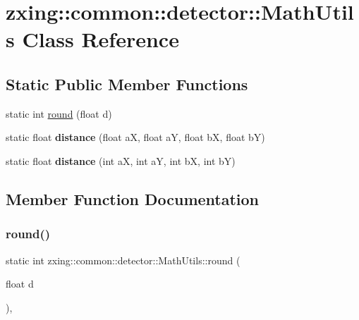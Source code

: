 \hypertarget{classzxing_1_1common_1_1detector_1_1_math_utils}{}\section{zxing\+:\+:common\+:\+:detector\+:\+:Math\+Utils Class Reference}
\label{classzxing_1_1common_1_1detector_1_1_math_utils}
\subsection*{Static Public Member Functions}
\begin{DoxyCompactItemize}
\item 
static int \mbox{\hyperlink{classzxing_1_1common_1_1detector_1_1_math_utils_a078e225901bb37f131130b53b9304bc3}{round}} (float d)
\item 
\mbox{\label{classzxing_1_1common_1_1detector_1_1_math_utils_a7c1f016269985e60e23987c7d73a069c}} 
static float {\bfseries distance} (float aX, float aY, float bX, float bY)
\item 
\mbox{\label{classzxing_1_1common_1_1detector_1_1_math_utils_a26b3d98128ac1b65952a1a9c5c783039}} 
static float {\bfseries distance} (int aX, int aY, int bX, int bY)
\end{DoxyCompactItemize}


\subsection{Member Function Documentation}
\mbox{\label{classzxing_1_1common_1_1detector_1_1_math_utils_a078e225901bb37f131130b53b9304bc3}} 
\subsubsection{\texorpdfstring{round()}{round()}}
{\footnotesize\ttfamily static int zxing\+::common\+::detector\+::\+Math\+Utils\+::round (\begin{DoxyParamCaption}\item[{float}]{d }\end{DoxyParamCaption})\hspace{0.3cm}{\ttfamily [inline]}, {\ttfamily [static]}}

